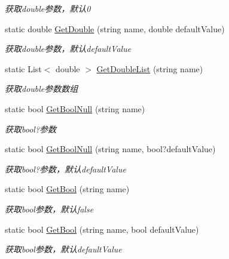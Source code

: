 \begin{DoxyCompactItemize}
\begin{DoxyCompactList}\small\item\em 获取double参数，默认0 \end{DoxyCompactList}\item 
static double \hyperlink{class_x_c_l_net_tools_1_1_string_hander_1_1_form_helper_a36ebb953cd52bbb1e999c98a163bd05a}{Get\-Double} (string name, double default\-Value)
\begin{DoxyCompactList}\small\item\em 获取double参数，默认default\-Value \end{DoxyCompactList}\item 
static List$<$ double $>$ \hyperlink{class_x_c_l_net_tools_1_1_string_hander_1_1_form_helper_a3e7cff936c30c0bdc0c61f2c34ca942d}{Get\-Double\-List} (string name)
\begin{DoxyCompactList}\small\item\em 获取double参数数组 \end{DoxyCompactList}\item 
static bool \hyperlink{class_x_c_l_net_tools_1_1_string_hander_1_1_form_helper_aaae65e05af2afe209759febba7ecdbd3}{Get\-Bool\-Null} (string name)
\begin{DoxyCompactList}\small\item\em 获取bool?参数 \end{DoxyCompactList}\item 
static bool \hyperlink{class_x_c_l_net_tools_1_1_string_hander_1_1_form_helper_a5ea790cf8ea2f82c6aa844b2bb1e2172}{Get\-Bool\-Null} (string name, bool?default\-Value)
\begin{DoxyCompactList}\small\item\em 获取bool?参数，默认default\-Value \end{DoxyCompactList}\item 
static bool \hyperlink{class_x_c_l_net_tools_1_1_string_hander_1_1_form_helper_a4eff1989f45cc5ae4608ba374956be17}{Get\-Bool} (string name)
\begin{DoxyCompactList}\small\item\em 获取bool参数，默认false \end{DoxyCompactList}\item 
static bool \hyperlink{class_x_c_l_net_tools_1_1_string_hander_1_1_form_helper_a449ca945de8a73643ac54eab5e37a3ef}{Get\-Bool} (string name, bool default\-Value)
\begin{DoxyCompactList}\small\item\em 获取bool参数，默认default\-Value \end{DoxyCompactList}\item 

\end{DoxyCompactItemize}
